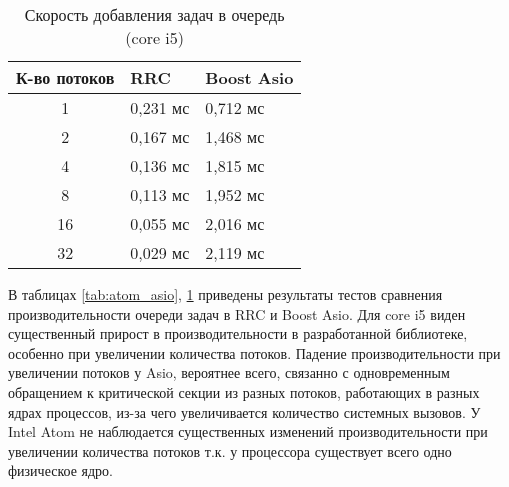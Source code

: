 \begin{table}[!htbp]
    \caption{\label{tab:core_asio}Скорость добавления задач в 
    очередь (core i5)}
    \begin{center}
        \begin{tabularx}{\linewidth}{|c|X|X|}
            \hline
            К-во потоков & RRC & Boost Asio  \\
            \hline
            1 & 0,231 мс & 0,712 мс \\
            \hline
            2 & 0,167 мс & 1,468 мс \\
            \hline
            4 & 0,136 мс & 1,815 мс \\
            \hline
            8 & 0,113 мс & 1,952 мс \\
            \hline
            16 & 0,055 мс & 2,016 мс \\
            \hline
            32 & 0,029 мс & 2,119 мс \\
            \hline
        \end{tabularx}
    \end{center}
\end{table}

В таблицах \ref{tab:atom_asio}, \ref{tab:core_asio} приведены 
результаты тестов сравнения производительности очереди задач в 
RRC и Boost Asio. Для core i5 виден существенный прирост в 
производительности в разработанной библиотеке, особенно при 
увеличении количества потоков. Падение производительности при 
увеличении потоков у Asio, вероятнее всего, связанно с 
одновременным обращением к критической секции из разных потоков, 
работающих в разных ядрах процессов, из-за чего увеличивается 
количество системных вызовов. У Intel Atom не наблюдается 
существенных изменений производительности при увеличении 
количества потоков т.к. у процессора существует всего одно 
физическое ядро.